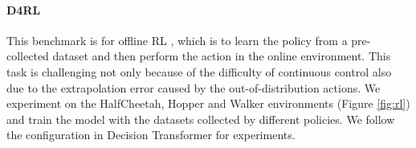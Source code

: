 \documentclass[nohyperref]{article}
\theoremstyle{plain}
\theoremstyle{definition}
\theoremstyle{remark}
\begin{document}
\begin{table}[h]
\vspace{-15pt}
	\caption{Statistical Results of the UEA dataset.}
	\label{tab:uea}
	\vskip 0.1in
	\centering
	\begin{small}
		\begin{sc}
			\renewcommand{\multirowsetup}{\centering}
		\end{sc}
	\end{small}
	\vspace{-10pt}
\end{table}

\paragraph{D4RL} 
This benchmark is for offline RL \cite{lange2012batch, levine2020offline}, which is to learn the policy from a pre-collected dataset and then perform the action in the online environment. This task is challenging not only because of the difficulty of continuous control also due to the extrapolation error caused by the out-of-distribution actions. We experiment on the HalfCheetah, Hopper and Walker environments (Figure \ref{fig:rl}) and train the model with the datasets collected by different policies. We follow the configuration in Decision Transformer \cite{chen2021decisiontransformer} for experiments. 
\end{document}
